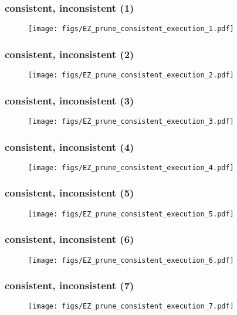 \documentclass[dvipdfmx,9pt,notheorems]{beamer}
\theoremstyle{definition}
\begin{document}
\begin{frame}\frametitle{consistent, inconsistent (1)}
\begin{figure}[htb]
  \centering
	\texttt{[image: figs/EZ\_prune\_consistent\_execution\_1.pdf]}
\end{figure}%
\pnote{
}
\end{frame}

\begin{frame}\frametitle{consistent, inconsistent (2)}
\begin{figure}[htb]
  \centering
	\texttt{[image: figs/EZ\_prune\_consistent\_execution\_2.pdf]}
\end{figure}%
\pnote{
}
\end{frame}

\begin{frame}\frametitle{consistent, inconsistent (3)}
\begin{figure}[htb]
  \centering
	\texttt{[image: figs/EZ\_prune\_consistent\_execution\_3.pdf]}
\end{figure}%
\pnote{
}
\end{frame}

\begin{frame}\frametitle{consistent, inconsistent (4)}
\begin{figure}[htb]
  \centering
	\texttt{[image: figs/EZ\_prune\_consistent\_execution\_4.pdf]}
\end{figure}%
\pnote{
}
\end{frame}

\begin{frame}\frametitle{consistent, inconsistent (5)}
\begin{figure}[htb]
  \centering
	\texttt{[image: figs/EZ\_prune\_consistent\_execution\_5.pdf]}
\end{figure}%
\pnote{
}
\end{frame}

\begin{frame}\frametitle{consistent, inconsistent (6)}
\begin{figure}[htb]
  \centering
	\texttt{[image: figs/EZ\_prune\_consistent\_execution\_6.pdf]}
\end{figure}%
\pnote{
}
\end{frame}

\begin{frame}\frametitle{consistent, inconsistent (7)}
\begin{figure}[htb]
  \centering
	\texttt{[image: figs/EZ\_prune\_consistent\_execution\_7.pdf]}
\end{figure}%
\pnote{
}
\end{frame}
\end{document}
